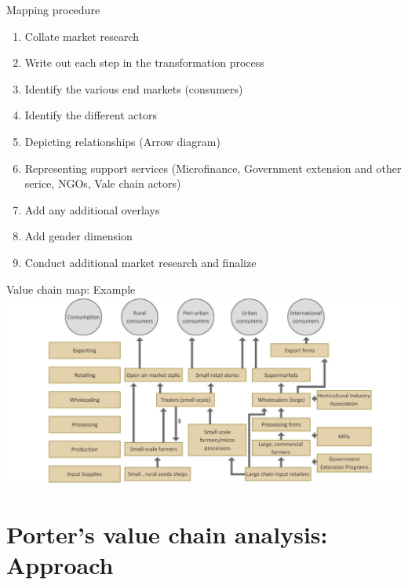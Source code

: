 \documentclass[12pt,ignorenonframetext,aspectratio=169]{beamer}
\providecommand{\tightlist}{%
  \setlength{\itemsep}{0pt}\setlength{\parskip}{0pt}}
\begin{document}
\begin{frame}{Mapping procedure}
\protect\hypertarget{mapping-procedure}{}
\begin{enumerate}
\tightlist
\item
  Collate market research
\item
  Write out each step in the transformation process
\item
  Identify the various end markets (consumers)
\item
  Identify the different actors
\item
  Depicting relationships (Arrow diagram)
\item
  Representing support services (Microfinance, Government extension and
  other serice, NGOs, Vale chain actors)
\item
  Add any additional overlays
\item
  Add gender dimension
\item
  Conduct additional market research and finalize
\end{enumerate}
\end{frame}

\begin{frame}{Value chain map: Example}
\protect\hypertarget{value-chain-map-example}{}
\includegraphics[width=0.85\linewidth]{./figs/value_chain_map}
\end{frame}

\hypertarget{porters-value-chain-analysis-approach}{%
\section{Porter's value chain analysis:
Approach}\label{porters-value-chain-analysis-approach}}
\end{document}

